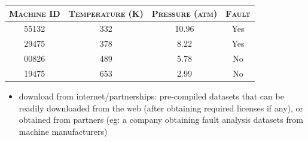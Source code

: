 \documentclass{article}[a4paper,12pt]
\theoremstyle{definition}
\begin{document}
\begin{center}
\begin{tabular}{|c|c|c|c|}
\hline
\textsc{Machine ID} & \textsc{Temperature (K)} & \textsc{Pressure (atm)} & \textsc{Fault}\\
\hline
55132 & 332 & 10.96 & Yes\\
\hline
29475 & 378 & 8.22 & Yes\\
\hline
00826 & 489 & 5.78 & No\\
\hline
19475 & 653 & 2.99 & No\\
\hline
\end{tabular}
\end{center}
\begin{itemize}
	\item download from internet/partnerships: pre-compiled datasets that can be readily downloaded from the web (after obtaining required licenses if any), or obtained from partners (eg: a company obtaining fault analysis datasets from machine manufacturers)
\end{itemize}
\end{document}
